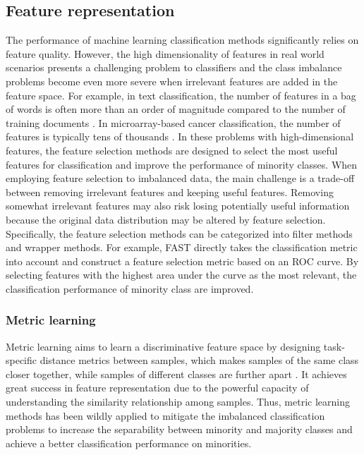 \subsection{Feature representation}


The performance of machine learning classification methods significantly relies on feature quality. However, the high dimensionality of features in real world scenarios presents a challenging problem to classifiers and the class imbalance problems become even more severe when irrelevant features are added in the feature space. For example, in text classification, the number of features in a bag of words is often more than an order of magnitude compared to the number of training documents \cite{xiong2006kernel}. In microarray-based cancer classification, the number of features is typically tens of thousands \cite{forman2003extensive}. In these problems with high-dimensional features, the feature selection methods are designed to select the most useful features for classification and improve the performance of minority classes. 
When employing feature selection to imbalanced data, the main challenge is a trade-off between removing irrelevant features and keeping useful features. Removing somewhat irrelevant features may also risk losing potentially useful information because the original data distribution may be altered by feature selection.
Specifically, the feature selection methods can be categorized into filter methods \cite{zheng2004feature, grobelnik1999feature} and wrapper methods.
For example, FAST \cite{chen2008fast} directly takes the classification metric into account and construct a feature selection metric based on an ROC curve. By selecting features with the highest area under the curve as the most relevant, the classification performance of minority class are improved.   


\subsubsection{Metric learning}
\cite{Ren_2022_CVPR}
\cite{Li_2022_CVPR}
\cite{park2021influence}

Metric learning aims to learn a discriminative feature space by designing task-specific distance metrics between samples, which makes samples of the same class closer together, while samples of different classes are further apart \cite{duan2017deep}. It achieves great success in feature representation due to the powerful capacity of understanding the similarity relationship among samples. Thus, metric learning methods has been wildly applied to mitigate the imbalanced classification problems to increase the separability between minority and majority classes and achieve a better classification performance on minorities. 

